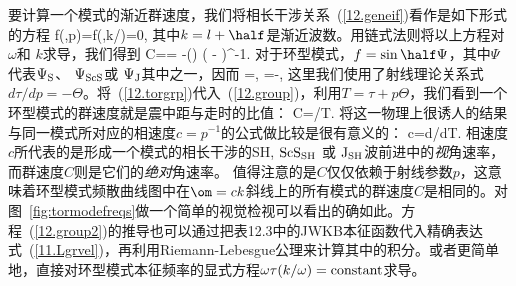 要计算一个模式的渐近群速度，我们将相长干涉关系~(\ref{12.geneif})看作是如下形式的方程
\eq \label{12.feq0}
f(\omega,p)=f(\omega,k/\omega)=0,
\en
其中$k=l+\half$是渐近波数。用链式法则将以上方程对$\omega$和 $k$求导，我们得到
\eq \label{12.group}
C==
-\left(\right)
\left(
-
\right)^{-1}.
\en
对于环型模式，$f=\sin\half\Psi$，其中$\Psi$代表$\Psi_{\rm S}$、 $\Psi_{\rm ScS}$或 $\Psi_{\rm J}$其中之一，因而
\eq \label{12.torgrp}
=\half\tau\cos\half\Psi,\qquad
{}
=-\half\Theta\cos\half\Psi,
\en
这里我们使用了射线理论关系式$d\tau/dp=-\Theta$。将~(\ref{12.torgrp})代入~(\ref{12.group})，利用$T=\tau+p\Theta$，我们看到一个环型模式的群速度就是震中距与走时的比值：
\eq \label{12.group2}
C=\Theta\hspace{-0.2 mm}/T.
\en
将这一物理上很诱人的结果与同一模式所对应的相速度$c=p^{-1}$的公式做比较是很有意义的：
\eq \label{group3}
c=d\Theta\hspace{-0.2 mm}/\hspace{-0.2 mm}dT.
\en
相速度$c$所代表的是形成一个模式的相长干涉的SH, ${\rm ScS}_{\rm SH}$ 或 ${\rm J}_{\rm SH}$波前进中的{\em 视\/}角速率，
%
%
而群速度$C$则是它们的{\em 绝对\/}角速率。
%
%
值得注意的是$C$仅仅依赖于射线参数$p$，这意味着环型模式频散曲线图中在$\om=ck$斜线上的所有模式的群速度$C$是相同的。对图~\ref{fig:tormodefreqs}做一个简单的视觉检视可以看出的确如此。方程~(\ref{12.group2})的推导也可以通过把表12.3中的JWKB本征函数代入精确表达式~(\ref{11.Lgrvel})，再利用Riemann-Lebesgue公理来计算其中的积分。或者更简单地，直接对环型模式本征频率的显式方程$\omega\tau(k/\omega)={\rm constant}$求导。

